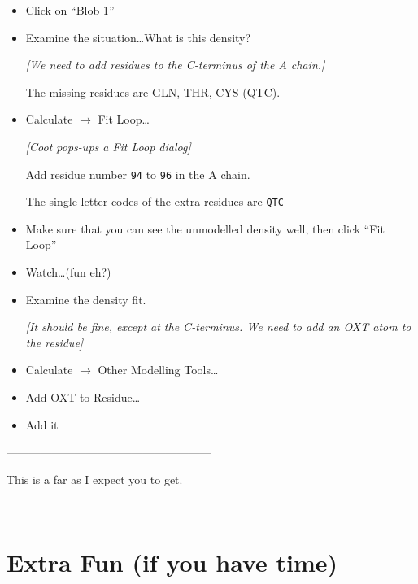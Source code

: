 \documentclass{article}
\begin{document}
\begin{itemize}
\item Click on ``\textsf{Blob 1}''

\item Examine the situation\ldots  What is this density?

  \emph{[We need to add residues to the C-terminus of the A chain.]}

The missing residues are GLN, THR, CYS (QTC).

\item \textsf{Calculate $\rightarrow$ Fit Loop\ldots}

\textsl{ [Coot pops-ups a Fit Loop dialog]}

Add residue number \texttt{94} to \texttt{96} in the A chain.

The single letter codes of the extra residues are \texttt{QTC}

\item Make sure that you can see the unmodelled density well, then click \textsf{``Fit Loop''}

\item Watch\ldots (fun eh?)

\item Examine the density fit. 
  
  \textsl{ [It should be fine, except at the C-terminus.  We need to
    add an OXT atom to the residue]}

\item \textsf{Calculate $\rightarrow$ Other Modelling Tools\ldots}

\item \textsf{Add OXT to Residue\ldots}

\item \textsf{Add it}

\end{itemize}



\begin{center}
------------------------------------------------------

This is a far as I expect you to get.

------------------------------------------------------
\end{center}


\section{Extra Fun (if you have time)}
\end{document}
